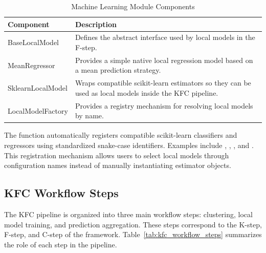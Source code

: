 \begin{table}[H]
      \centering
      \caption{Machine Learning Module Components}
      \label{tab:machine_learning_module_components}
      \renewcommand{\arraystretch}{1.2}
      \begin{tabularx}{\textwidth}{
                  >{\raggedright\arraybackslash}p{3.5cm}
                  >{\raggedright\arraybackslash}X
            }
            \toprule
            \textbf{Component} & \textbf{Description}                                                             \\
            \midrule
            BaseLocalModel     &
            Defines the abstract interface used by local models in the F-step.                                    \\

            MeanRegressor      &
            Provides a simple native local regression model based on a mean prediction strategy.                  \\

            SklearnLocalModel  &
            Wraps compatible scikit-learn estimators so they can be used as local models inside the KFC pipeline. \\

            LocalModelFactory  &
            Provides a registry mechanism for resolving local models by name.                                     \\
            \bottomrule
      \end{tabularx}
\end{table}

The function  automatically registers compatible scikit-learn classifiers and regressors using standardized snake-case identifiers. Examples include , , , and . This registration mechanism allows users to select local models through configuration names instead of manually instantiating estimator objects.

\subsection{KFC Workflow Steps}

\hs The KFC pipeline is organized into three main workflow steps: clustering, local model training, and prediction aggregation. These steps correspond to the K-step, F-step, and C-step of the framework. Table~\ref{tab:kfc_workflow_steps} summarizes the role of each step in the pipeline.

